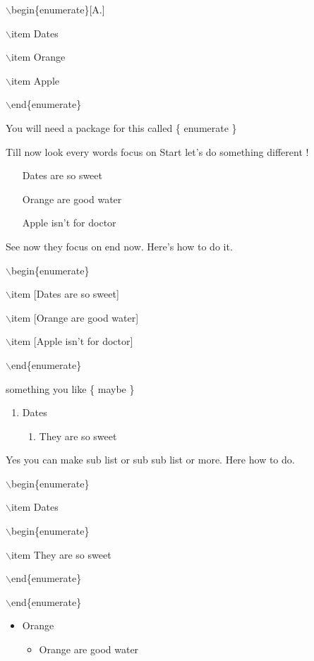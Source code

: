 \documentclass[11pt]{article}
\begin{document}
$\backslash$begin\{enumerate\}[A.]

$\backslash$item Dates

$\backslash$item Orange

$\backslash$item Apple

$\backslash$end\{enumerate\}

You will need a package for this called \{ enumerate \}

\vspace{1cm}

Till now look every words focus on Start let's do something different !

\begin{enumerate}
\item[Dates are so sweet]
\item[Orange are good water]
\item[Apple isn't for doctor]
\end{enumerate}

See now they focus on end now. Here's how to do it.

$\backslash$begin\{enumerate\}

$\backslash$item [Dates are so sweet]

$\backslash$item [Orange are good water]

$\backslash$item [Apple isn't for doctor]

$\backslash$end\{enumerate\}

something you like \{ maybe \}

\begin{enumerate}
\item Dates
\begin{enumerate}
\item They are so sweet
\end{enumerate}
\end{enumerate}

Yes you can make sub list or sub sub list or more. Here how to do.

$\backslash$begin\{enumerate\}

$\backslash$item Dates

$\backslash$begin\{enumerate\}

$\backslash$item They are so sweet

$\backslash$end\{enumerate\}

$\backslash$end\{enumerate\}

\begin{itemize}
\item Orange
\begin{itemize}
\item Orange are good water
\end{itemize}
\end{itemize}
\end{document}
